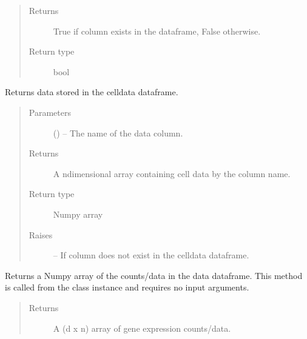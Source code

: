 \documentclass[letterpaper,10pt,english]{sphinxmanual}
\begin{document}
\begin{fulllineitems}
\begin{fulllineitems}
\begin{quote}
\begin{description}
\item[{Returns}] \leavevmode
True if column exists in the dataframe, False otherwise.

\item[{Return type}] \leavevmode
bool

\end{description}\end{quote}

\end{fulllineitems}


\begin{fulllineitems}
\label{\detokenize{index:singlecelldata.SingleCell.getCellData}}
Returns data stored in the celldata dataframe.
\begin{quote}\begin{description}
\item[{Parameters}] \leavevmode
{} () – The name of the data column.

\item[{Returns}] \leavevmode
A n\sphinxhyphen{}dimensional array containing cell data by the column name.

\item[{Return type}] \leavevmode
Numpy array

\item[{Raises}] \leavevmode
{} – If column does not exist in the celldata dataframe.

\end{description}\end{quote}

\end{fulllineitems}


\begin{fulllineitems}
\label{\detokenize{index:singlecelldata.SingleCell.getCounts}}
Returns a Numpy array of the counts/data in the data dataframe. This method is called from the
class instance and requires no input arguments.
\begin{quote}\begin{description}
\item[{Returns}] \leavevmode
A (d x n) array of gene expression counts/data.


\end{description}
\end{quote}
\end{fulllineitems}
\end{fulllineitems}
\end{document}
